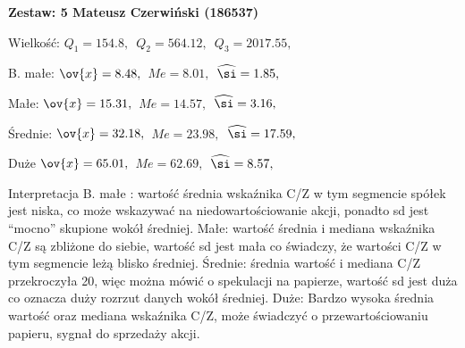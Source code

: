 \textbf{Zestaw: 5 Mateusz Czerwiński (186537) }

Wielkość: $Q_1= 154.8 ,\,$ $Q_2= 564.12 ,\,$ $Q_3= 2017.55 ,\,$

B. małe: $\ov{x}= 8.48 ,\,$ $Me= 8.01 ,\,$ $\widehat{\si}= 1.85 ,$ 

Małe: $\ov{x}= 15.31 ,\,$ $Me= 14.57 ,\,$ $\widehat{\si}= 3.16 ,\,$

Średnie: $\ov{x}= 32.18 ,\,$ $Me= 23.98 ,\,$ $\widehat{\si}= 17.59 ,\,$ 

Duże $\ov{x}= 65.01 ,\,$ $Me= 62.69 ,\,$ $\widehat{\si}= 8.57 ,\,$ 

Interpretacja
B. małe : wartość średnia wskaźnika C/Z w tym segmencie spółek jest niska, co może wskazywać na niedowartościowanie akcji, ponadto sd jest ``mocno'' skupione wokół średniej.
Małe: wartość średnia i mediana wskaźnika C/Z są zbliżone do siebie, wartość sd jest mała co świadczy, że wartości C/Z w tym segmencie leżą blisko średniej.
Średnie: średnia wartość i mediana C/Z przekroczyła 20, więc można mówić o spekulacji na papierze, wartość sd jest duża co oznacza duży rozrzut danych wokół średniej.
Duże: Bardzo wysoka średnia wartość oraz mediana wskaźnika C/Z, może świadczyć o przewartościowaniu papieru, sygnał do sprzedaży akcji.
